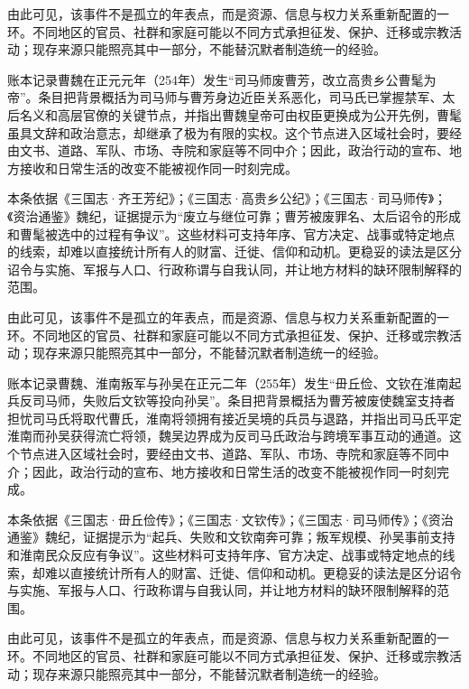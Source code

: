 由此可见，该事件不是孤立的年表点，而是资源、信息与权力关系重新配置的一环。不同地区的官员、社群和家庭可能以不同方式承担征发、保护、迁移或宗教活动；现存来源只能照亮其中一部分，不能替沉默者制造统一的经验。

账本记录曹魏在正元元年（254年）发生“司马师废曹芳，改立高贵乡公曹髦为帝”。条目把背景概括为司马师与曹芳身边近臣关系恶化，司马氏已掌握禁军、太后名义和高层官僚的关键节点，并指出曹魏皇帝可由权臣更换成为公开先例，曹髦虽具文辞和政治意志，却继承了极为有限的实权。这个节点进入区域社会时，要经由文书、道路、军队、市场、寺院和家庭等不同中介；因此，政治行动的宣布、地方接收和日常生活的改变不能被视作同一时刻完成。

本条依据《三国志·齐王芳纪》；《三国志·高贵乡公纪》；《三国志·司马师传》；《资治通鉴》魏纪，证据提示为“废立与继位可靠；曹芳被废罪名、太后诏令的形成和曹髦被选中的过程有争议”。这些材料可支持年序、官方决定、战事或特定地点的线索，却难以直接统计所有人的财富、迁徙、信仰和动机。更稳妥的读法是区分诏令与实施、军报与人口、行政称谓与自我认同，并让地方材料的缺环限制解释的范围。

由此可见，该事件不是孤立的年表点，而是资源、信息与权力关系重新配置的一环。不同地区的官员、社群和家庭可能以不同方式承担征发、保护、迁移或宗教活动；现存来源只能照亮其中一部分，不能替沉默者制造统一的经验。

账本记录曹魏、淮南叛军与孙吴在正元二年（255年）发生“毌丘俭、文钦在淮南起兵反司马师，失败后文钦等投向孙吴”。条目把背景概括为曹芳被废使魏室支持者担忧司马氏将取代曹氏，淮南将领拥有接近吴境的兵员与退路，并指出司马氏平定淮南而孙吴获得流亡将领，魏吴边界成为反司马氏政治与跨境军事互动的通道。这个节点进入区域社会时，要经由文书、道路、军队、市场、寺院和家庭等不同中介；因此，政治行动的宣布、地方接收和日常生活的改变不能被视作同一时刻完成。

本条依据《三国志·毌丘俭传》；《三国志·文钦传》；《三国志·司马师传》；《资治通鉴》魏纪，证据提示为“起兵、失败和文钦南奔可靠；叛军规模、孙吴事前支持和淮南民众反应有争议”。这些材料可支持年序、官方决定、战事或特定地点的线索，却难以直接统计所有人的财富、迁徙、信仰和动机。更稳妥的读法是区分诏令与实施、军报与人口、行政称谓与自我认同，并让地方材料的缺环限制解释的范围。

由此可见，该事件不是孤立的年表点，而是资源、信息与权力关系重新配置的一环。不同地区的官员、社群和家庭可能以不同方式承担征发、保护、迁移或宗教活动；现存来源只能照亮其中一部分，不能替沉默者制造统一的经验。

